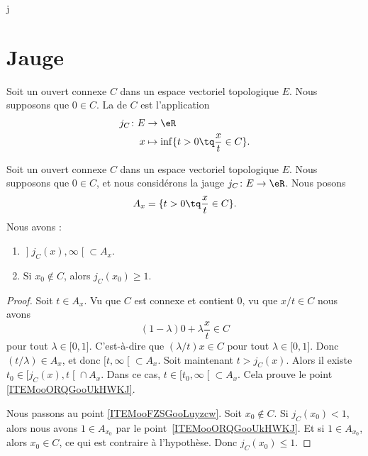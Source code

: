 j%

\section{Jauge}


\begin{definition}	\label{DEFooRNZBooLSdowc}
	Soit un ouvert connexe \( C\) dans un espace vectoriel topologique \( E\). Nous supposons que \( 0\in C\). La  de \( C\) est l'application
	\begin{equation}
		\begin{aligned}
			j_C\colon E & \to \eR                                        \\
			x           & \mapsto \inf\{ t>0\tq \frac{ x }{ t }\in C \}.
		\end{aligned}
	\end{equation}
\end{definition}

\begin{lemma}	\label{LEMooEUETooMAAnNO}
	Soit un ouvert connexe \( C\) dans un espace vectoriel topologique \( E\). Nous supposons que \( 0\in C\), et nous considérons la jauge \(j_C \colon E\to \eR  \). Nous posons
	\begin{equation}
		A_x=\{ t>0\tq \frac{ x }{ t }\in C \}.
	\end{equation}
	Nous avons :
	\begin{enumerate}
		\item		\label{ITEMooORQGooUkHWKJ}
		      \( \mathopen] j_C(x),\infty\mathclose[\subset A_x\).
		\item		\label{ITEMooFZSGooLuyzcw}
		      Si \( x_0\not\in C\), alors \( j_C(x_0)\geq 1\).
	\end{enumerate}
\end{lemma}

\begin{proof}
	Soit \( t\in A_x\). Vu que \( C\) est connexe et contient \( 0\), vu que \( x/t\in C\) nous avons
	\begin{equation}
		(1-\lambda)0+\lambda \frac{ x }{ t }\in C
	\end{equation}
	pour tout \( \lambda\in\mathopen[ 0,1\mathclose]\). C'est-à-dire que \( (\lambda/t)x\in C\) pour tout \( \lambda\in \mathopen[ 0,1\mathclose]\). Donc \( (t/\lambda)\in A_x\), et donc \( \mathopen[ t,\infty\mathclose[\subset A_x\). Soit maintenant \( t>j_C(x)\). Alors il existe \( t_0\in \mathopen[ j_C(x),t\mathclose[\cap A_x\). Dans ce cas, \( t\in \mathopen[ t_0,\infty\mathclose[\subset A_x\). Cela prouve le point \ref{ITEMooORQGooUkHWKJ}.

	Nous passons au point \ref{ITEMooFZSGooLuyzcw}. Soit \( x_0\not\in C\). Si \( j_C(x_0)<1\), alors nous avons \( 1\in A_{x_0}\) par le point~\ref{ITEMooORQGooUkHWKJ}. Et si \( 1\in A_{x_0}\), alors \( x_0\in C\), ce qui est contraire à l'hypothèse. Donc \( j_C(x_0)\leq 1\).
\end{proof}

